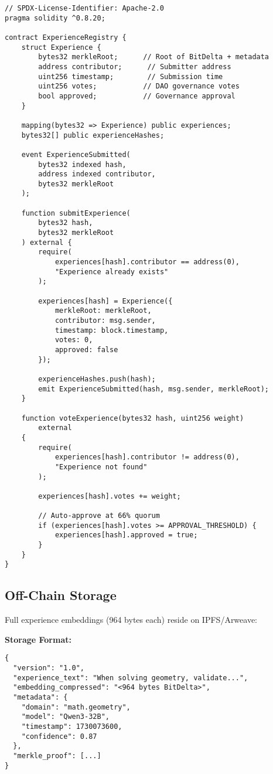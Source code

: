 \documentclass[11pt,a4paper]{article}
\begin{document}
\begin{lstlisting}[language=Solidity, caption=ExperienceRegistry smart contract]
// SPDX-License-Identifier: Apache-2.0
pragma solidity ^0.8.20;

contract ExperienceRegistry {
    struct Experience {
        bytes32 merkleRoot;      // Root of BitDelta + metadata
        address contributor;      // Submitter address
        uint256 timestamp;        // Submission time
        uint256 votes;           // DAO governance votes
        bool approved;           // Governance approval
    }
    
    mapping(bytes32 => Experience) public experiences;
    bytes32[] public experienceHashes;
    
    event ExperienceSubmitted(
        bytes32 indexed hash,
        address indexed contributor,
        bytes32 merkleRoot
    );
    
    function submitExperience(
        bytes32 hash,
        bytes32 merkleRoot
    ) external {
        require(
            experiences[hash].contributor == address(0),
            "Experience already exists"
        );
        
        experiences[hash] = Experience({
            merkleRoot: merkleRoot,
            contributor: msg.sender,
            timestamp: block.timestamp,
            votes: 0,
            approved: false
        });
        
        experienceHashes.push(hash);
        emit ExperienceSubmitted(hash, msg.sender, merkleRoot);
    }
    
    function voteExperience(bytes32 hash, uint256 weight) 
        external 
    {
        require(
            experiences[hash].contributor != address(0),
            "Experience not found"
        );
        
        experiences[hash].votes += weight;
        
        // Auto-approve at 66% quorum
        if (experiences[hash].votes >= APPROVAL_THRESHOLD) {
            experiences[hash].approved = true;
        }
    }
}
\end{lstlisting}

\subsection{Off-Chain Storage}

Full experience embeddings (964 bytes each) reside on IPFS/Arweave:

\textbf{Storage Format:}
\begin{verbatim}
{
  "version": "1.0",
  "experience_text": "When solving geometry, validate...",
  "embedding_compressed": "<964 bytes BitDelta>",
  "metadata": {
    "domain": "math.geometry",
    "model": "Qwen3-32B",
    "timestamp": 1730073600,
    "confidence": 0.87
  },
  "merkle_proof": [...]
}
\end{verbatim}
\end{document}
